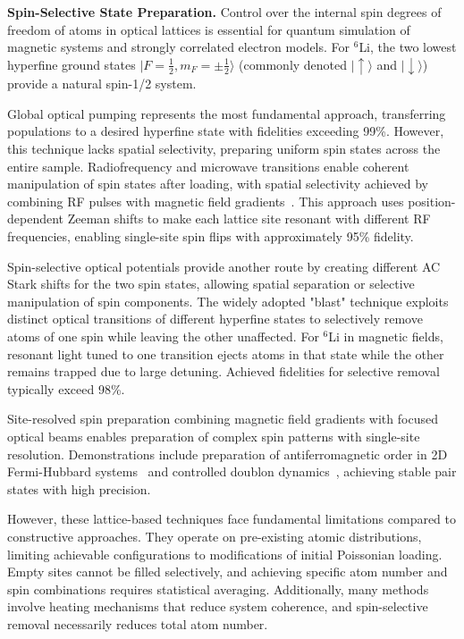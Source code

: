 \textbf{Spin-Selective State Preparation.} Control over the internal spin degrees of freedom of atoms in optical lattices is essential for quantum simulation of magnetic systems and strongly correlated electron models. For $^6$Li, the two lowest hyperfine ground states $|F=\frac{1}{2}, m_F=\pm\frac{1}{2}\rangle$ (commonly denoted $|\uparrow\rangle$ and $|\downarrow\rangle$) provide a natural spin-1/2 system.

Global optical pumping represents the most fundamental approach, transferring populations to a desired hyperfine state with fidelities exceeding 99\%. However, this technique lacks spatial selectivity, preparing uniform spin states across the entire sample. Radiofrequency and microwave transitions enable coherent manipulation of spin states after loading, with spatial selectivity achieved by combining RF pulses with magnetic field gradients~\cite{weitenberg_single-spin_2011}. This approach uses position-dependent Zeeman shifts to make each lattice site resonant with different RF frequencies, enabling single-site spin flips with approximately 95\% fidelity.

Spin-selective optical potentials provide another route by creating different AC Stark shifts for the two spin states, allowing spatial separation or selective manipulation of spin components. The widely adopted "blast" technique exploits distinct optical transitions of different hyperfine states to selectively remove atoms of one spin while leaving the other unaffected. For $^6$Li in magnetic fields, resonant light tuned to one transition ejects atoms in that state while the other remains trapped due to large detuning. Achieved fidelities for selective removal typically exceed 98\%.

Site-resolved spin preparation combining magnetic field gradients with focused optical beams enables preparation of complex spin patterns with single-site resolution. Demonstrations include preparation of antiferromagnetic order in 2D Fermi-Hubbard systems~\cite{mazurenko_cold-atom_2017} and controlled doublon dynamics~\cite{covey_doublon_2016}, achieving stable pair states with high precision.

However, these lattice-based techniques face fundamental limitations compared to constructive approaches. They operate on pre-existing atomic distributions, limiting achievable configurations to modifications of initial Poissonian loading. Empty sites cannot be filled selectively, and achieving specific atom number and spin combinations requires statistical averaging. Additionally, many methods involve heating mechanisms that reduce system coherence, and spin-selective removal necessarily reduces total atom number.


